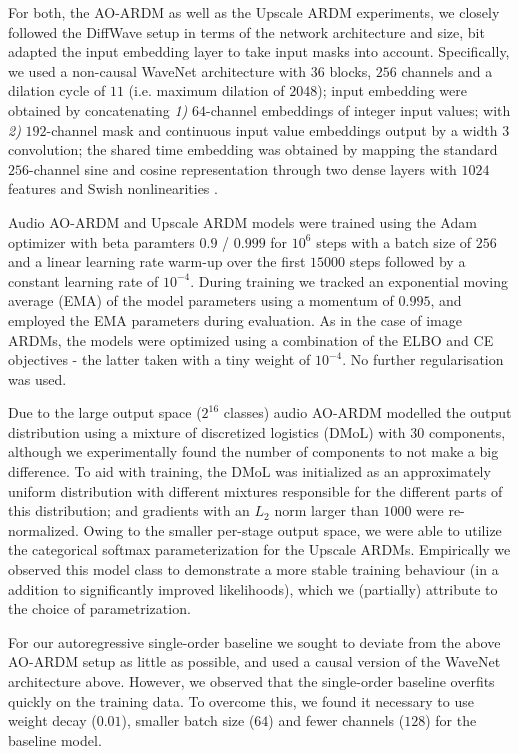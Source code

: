 \documentclass{article} \usepackage{iclr2022_conference,times}
\begin{document}
For both, the AO-ARDM as well as the Upscale ARDM experiments, we closely followed the DiffWave setup \citep{kong2021diffwave} in terms of the network architecture and size, bit adapted the input embedding layer to take input masks into account. Specifically, we used a non-causal WaveNet \citep{oord2016wavenet} architecture with $36$ blocks, $256$ channels and a dilation cycle of $11$ (i.e. maximum dilation of $2048$); input embedding were obtained by concatenating \textit{1)} $64$-channel embeddings of integer input values; with \textit{2)} $192$-channel mask and continuous input value embeddings output by a width $3$ convolution; the shared time embedding was obtained by mapping the standard $256$-channel sine and cosine representation through two dense layers with $1024$ features and Swish nonlinearities \citep{elfwing2018sigmoid}.

Audio AO-ARDM and Upscale ARDM models were trained using the Adam optimizer \citep{kingma2014adam} with beta paramters $0.9$ / $0.999$ for $10^6$ steps with a batch size of $256$ and a linear learning rate warm-up over the first $15000$ steps followed by a constant learning rate of $10^{-4}$. During training we tracked an exponential moving average (EMA) of the model parameters using a momentum of $0.995$, and employed the EMA parameters during evaluation. As in the case of image ARDMs, the models were optimized using a combination of the ELBO and CE objectives - the latter taken with a tiny weight of $10^{-4}$. No further regularisation was used.

Due to the large output space ($2^{16}$ classes) audio AO-ARDM modelled the output distribution using a mixture of discretized logistics (DMoL) with $30$ components, although we experimentally found the number of components to not make a big difference. To aid with training, the DMoL was initialized as an approximately uniform distribution with different mixtures responsible for the different parts of this distribution; and gradients with an $L_2$ norm larger than $1000$ were re-normalized. Owing to the smaller per-stage output space, we were able to utilize the categorical softmax parameterization for the Upscale ARDMs. Empirically we observed this model class to demonstrate a more stable training behaviour (in a addition to significantly improved likelihoods), which we (partially) attribute to the choice of parametrization.

For our autoregressive single-order baseline we sought to deviate from the above AO-ARDM setup as little as possible, and used a causal version of the WaveNet architecture above. However, we observed that the single-order baseline overfits quickly on the training data. To overcome this, we found it necessary to use weight decay ($0.01$), smaller batch size ($64$) and fewer channels ($128$) for the baseline model.
 
\end{document}
